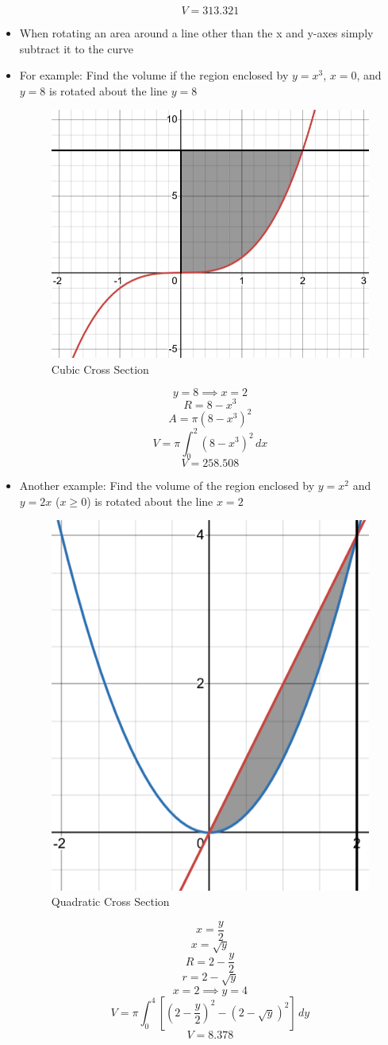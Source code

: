 \documentclass{article}
\begin{document}
\begin{itemize}
        \[V = 313.321\]
    \newpage
    \item When rotating an area around a line other than the x and y-axes simply subtract it to the curve
    \item For example: Find the volume if the region enclosed by $y=x^3$, $x=0$, and $y=8$ is rotated about the line $y=8$
    \begin{figure}[h]
        \centering
        \includegraphics[width=0.3\linewidth]{images/Cubic Cross Section.png}
        \caption{Cubic Cross Section}
        \label{fig:cubicCrossSection}
    \end{figure}
        \[y = 8\implies x = 2\]
        \[R = 8-x^3\]
        \[A = \pi\left(8-x^3\right)^2\]
        \[V = \pi\int_0^2\left(8-x^3\right)^2\,dx\]
        \[V = 258.508\]
    \item Another example:  Find the volume of the region enclosed by $y=x^2$ and $y=2x$ ($x\geq0$) is rotated about the line $x=2$
    \begin{figure}[h]
        \centering
        \includegraphics[width=0.3\linewidth]{images/Quadratic Cross Section.png}
        \caption{Quadratic Cross Section}
        \label{fig:quadraticCrossSection}
    \end{figure}
        \[x = \frac{y}{2}\]
        \[x = \sqrt{y}\]
        \[R = 2-\frac{y}{2}\]
        \[r = 2-\sqrt{y}\]
        \[x = 2\implies y = 4\]
        \[V = \pi\int_0^4\left[\left(2-\frac{y}{2}\right)^2-\left(2-\sqrt{y}\right)^2\right]\,dy\]
        \[V = 8.378\]
\end{itemize}
\end{document}
